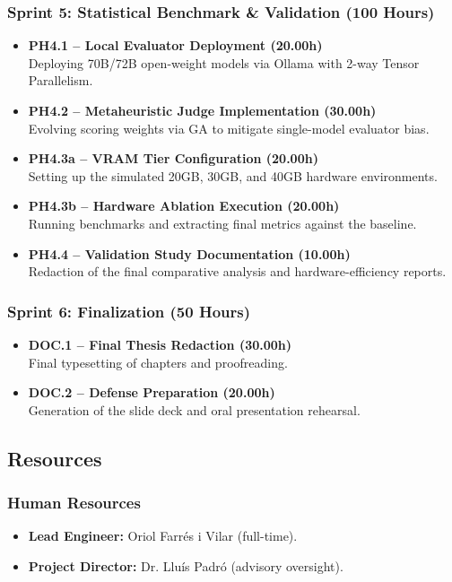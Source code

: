 \subsubsection*{Sprint 5: Statistical Benchmark \& Validation (100 Hours)}
\begin{itemize}[leftmargin=*, itemsep=4pt]
    \item \textbf{PH4.1 -- Local Evaluator Deployment (20.00h)} \\
    Deploying 70B/72B open-weight models via Ollama with 2-way Tensor Parallelism.
    \item \textbf{PH4.2 -- Metaheuristic Judge Implementation (30.00h)} \\
    Evolving scoring weights via GA to mitigate single-model evaluator bias.
    \item \textbf{PH4.3a -- VRAM Tier Configuration (20.00h)} \\
    Setting up the simulated 20GB, 30GB, and 40GB hardware environments.
    \item \textbf{PH4.3b -- Hardware Ablation Execution (20.00h)} \\
    Running benchmarks and extracting final metrics against the baseline.
    \item \textbf{PH4.4 -- Validation Study Documentation (10.00h)} \\
    Redaction of the final comparative analysis and hardware-efficiency reports.
\end{itemize}

\subsubsection*{Sprint 6: Finalization (50 Hours)}
\begin{itemize}[leftmargin=*, itemsep=4pt]
    \item \textbf{DOC.1 -- Final Thesis Redaction (30.00h)} \\
    Final typesetting of chapters and proofreading.
    \item \textbf{DOC.2 -- Defense Preparation (20.00h)} \\
    Generation of the slide deck and oral presentation rehearsal.
\end{itemize}




\subsection{Resources}
\label{subsec:resources}
\subsubsection*{Human Resources}
\label{subsubsec:human-resources}
\begin{itemize}
    \item \textbf{Lead Engineer:} Oriol Farrés i Vilar (full-time).
    \item \textbf{Project Director:} Dr. Lluís Padró (advisory oversight).
\end{itemize}

